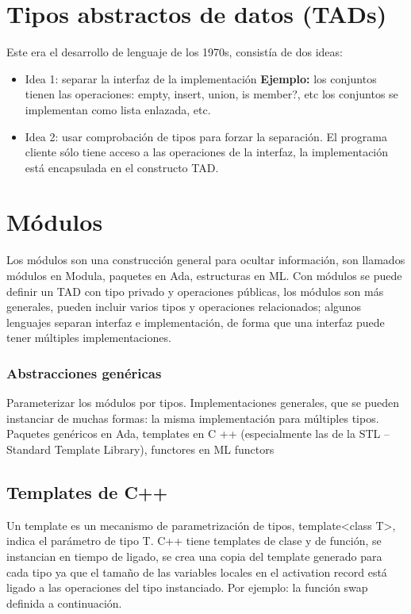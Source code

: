 \documentclass[10pt,a4paper]{report}
\begin{document}
\section{Tipos abstractos de datos (TADs)}
Este era el desarrollo de lenguaje de los 1970s, consistía de dos ideas:
\begin{itemize}
    \item Idea 1: separar la interfaz de la implementación
    \textbf{Ejemplo:} los conjuntos tienen las operaciones: empty, insert, union, is member?, etc
    los conjuntos se implementan como lista enlazada, etc.
    \item Idea 2: usar comprobación de tipos para forzar la separación. El programa 
    cliente sólo tiene acceso a las operaciones de la interfaz, la implementación está 
    encapsulada en el constructo TAD.
\end{itemize}

\section{Módulos}

\par Los módulos son una construcción general para ocultar información, son 
llamados módulos en Modula, paquetes en Ada, estructuras en ML. Con módulos se 
puede definir un TAD con tipo privado y operaciones públicas, los módulos son más generales, pueden incluir varios tipos y operaciones relacionados; algunos lenguajes separan interfaz e implementación, de forma que una interfaz puede tener múltiples implementaciones.

\subsubsection{Abstracciones genéricas }
\par Parameterizar los módulos por tipos. Implementaciones generales, que se 
pueden instanciar de muchas formas: la misma implementación para múltiples tipos. 
Paquetes genéricos en Ada, templates en C ++ (especialmente las de la STL – 
Standard Template Library), functores en ML functors

\subsection{Templates de C++}
\par Un template es un mecanismo de parametrización de tipos, 
template<class T>, indica el parámetro de tipo T. C++ tiene templates de clase y de 
función, se instancian en tiempo de ligado, se crea una copia del template generado 
para cada tipo ya que el tamaño de las variables locales en el activation record está 
ligado a las operaciones del tipo instanciado. Por ejemplo: la función swap definida a 
continuación.
\end{document}

